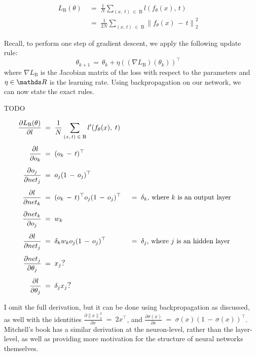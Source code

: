 \begin{align*}
    L_{\mathrm{B}}(\theta) \;&=\; \frac{1}{N}\sum_{(x,\; t) \;\in\; \mathrm{B}} l(f_\theta(x),\, t) \\[0.5em]
    &=\; \frac{1}{2N}\sum_{(x,\, t) \;\in\; \mathrm{B}} \left\lVert f_\theta(x) \,-\, t \right\rVert_2^2
\end{align*}

Recall, to perform one step of gradient descent, we apply the following update rule:
\begin{equation*}
    \theta_{k+1} \,=\, \theta_k + \eta ((\nabla L_\mathrm{B})(\theta_k))^\top
\end{equation*}
where \(\nabla L_\mathrm{B}\) is the Jacobian matrix of the loss with respect to the parameters and \(\eta\in\R\) is the learning rate. Using backpropagation on our network, we can now state the exact rules.

TODO 

\begin{align*}
    \frac{\partial L_\mathrm{B}(\theta)}{\partial l} \;&=\; \frac{1}{N}\sum_{(x,\, t) \;\in\; \mathrm{B}} l^\prime(f_\theta(x),\; t) \\[0.5em]
    \frac{\partial l}{\partial o_k} \;&=\; (o_k \,-\, t)^\top \\[0.5em]
    \frac{\partial o_j}{\partial net_j} \;&=\; o_j(\mathrm{1} \,-\, o_j)^\top \\[0.5em]
    \frac{\partial l}{\partial net_k} \;&=\; (o_k \,-\, t)^\top o_j(\mathrm{1} \,-\, o_j)^\top \;&&=\; \delta_k\text{, where }k\text{ is an output layer} \\[0.5em]
    \frac{\partial net_k}{\partial o_j} \;&=\; w_k \\[0.5em]
    \frac{\partial l}{\partial net_j} \;&=\; \delta_k w_k o_j(\mathrm{1} \,-\, o_j)^\top \;&&=\; \delta_j\text{, where }j\text{ is an hidden layer} \\[0.5em]
    \frac{\partial net_j}{\partial \theta_j} \;&=\; x_j\text{\large ?}\\[0.5em]
    \frac{\partial l}{\partial \theta_j} \;&=\; \delta_jx_j\text{\large ?}
\end{align*}

I omit the full derivation, but it can be done using backpropagation as discussed, as well with the identities
\(\frac{\partial \left\lVert x \right\rVert_2^2}{\partial x} \;=\; 2x^\top\), and
\(\frac{\partial \sigma(x)}{\partial x} \;=\; \sigma(x)(\mathrm{1} \,-\, \sigma(x))^\top\).
Mitchell's book \cite[ch.~4]{Mitchell1997-ML} has a similar derivation at the neuron-level, rather than the layer-level, as well as providing more motivation for the structure of neural networks themselves.


